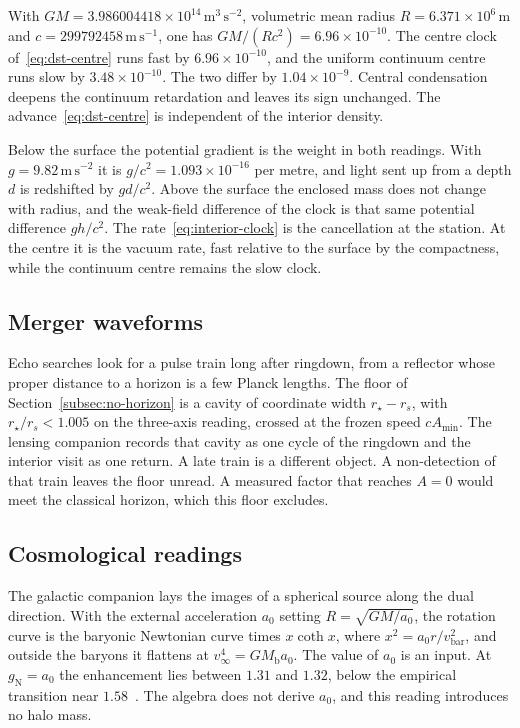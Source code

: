 \documentclass[a4paper]{article}
\begin{document}
With \(GM=3.986004418\times 10^{14}\,\mathrm{m^{3}\,s^{-2}}\), volumetric mean radius \(R=6.371\times 10^{6}\,\mathrm{m}\) and \(c=299792458\,\mathrm{m\,s^{-1}}\), one has \(GM/(Rc^{2})=6.96\times 10^{-10}\). The centre clock of~\eqref{eq:dst-centre} runs fast by \(6.96\times 10^{-10}\), and the uniform continuum centre runs slow by \(3.48\times 10^{-10}\). The two differ by \(1.04\times 10^{-9}\). Central condensation deepens the continuum retardation and leaves its sign unchanged. The advance~\eqref{eq:dst-centre} is independent of the interior density.

Below the surface the potential gradient is the weight in both readings. With \(g=9.82\,\mathrm{m\,s^{-2}}\) it is \(g/c^{2}=1.093\times 10^{-16}\) per metre, and light sent up from a depth \(d\) is redshifted by \(gd/c^{2}\). Above the surface the enclosed mass does not change with radius, and the weak-field difference of the clock is that same potential difference \(gh/c^{2}\). The rate~\eqref{eq:interior-clock} is the cancellation at the station. At the centre it is the vacuum rate, fast relative to the surface by the compactness, while the continuum centre remains the slow clock.

\subsection{Merger waveforms}

Echo searches look for a pulse train long after ringdown, from a reflector whose proper distance to a horizon is a few Planck lengths. The floor of Section~\ref{subsec:no-horizon} is a cavity of coordinate width \(r_\star-r_s\), with \(r_\star/r_s<1.005\) on the three-axis reading, crossed at the frozen speed \(c A_{\min}\). The lensing companion records that cavity as one cycle of the ringdown and the interior visit as one return. A late train is a different object. A non-detection of that train leaves the floor unread. A measured factor that reaches \(A=0\) would meet the classical horizon, which this floor excludes.

\subsection{Cosmological readings}

The galactic companion lays the images of a spherical source along the dual direction. With the external acceleration \(a_0\) setting \(R=\sqrt{GM/a_0}\), the rotation curve is the baryonic Newtonian curve times \(x\coth x\), where \(x^2=a_0 r/v_{\mathrm{bar}}^2\), and outside the baryons it flattens at \(v_\infty^4=GM_{\mathrm{b}}a_0\). The value of \(a_0\) is an input. At \(g_{\mathrm{N}}=a_0\) the enhancement lies between \(1.31\) and \(1.32\), below the empirical transition near \(1.58\)~\cite{dst-galactic}. The algebra does not derive \(a_0\), and this reading introduces no halo mass.
\end{document}
